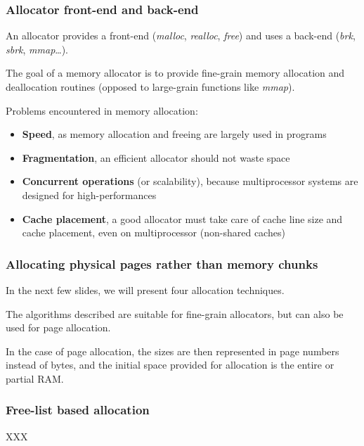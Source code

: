 
\begin{frame}
  \frametitle{Allocator front-end and back-end}

  An allocator provides a front-end (\emph{malloc}, \emph{realloc},
  \emph{free}) and uses a back-end (\emph{brk}, \emph{sbrk},
  \emph{mmap}\ldots).

  \-

  The goal of a memory allocator is to provide fine-grain memory
  allocation and deallocation routines (opposed to large-grain
  functions like \emph{mmap}).

  \-

  Problems encountered in memory allocation:

  \begin{itemize}
  \item
    \textbf{Speed}, as memory allocation and freeing are largely used
    in programs
  \item
    \textbf{Fragmentation}, an efficient allocator should not waste
    space
  \item
    \textbf{Concurrent operations} (or scalability), because
    multiprocessor systems are designed for high-performances
  \item
    \textbf{Cache placement}, a good allocator must take care of cache
    line size and cache placement, even on multiprocessor (non-shared
    caches)
  \end{itemize}

\end{frame}


\begin{frame}
  \frametitle{Allocating physical pages rather than memory chunks}

  In the next few slides, we will present four allocation techniques.

  \-

  The algorithms described are suitable for fine-grain allocators, but
  can also be used for page allocation.

  \-

  In the case of page allocation, the sizes are then represented in
  page numbers instead of bytes, and the initial space provided for
  allocation is the entire or partial RAM.

\end{frame}


\begin{frame}
  \frametitle{Free-list based allocation}

  XXX

\end{frame}

